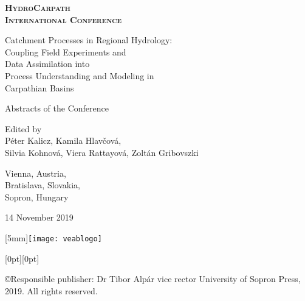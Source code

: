 \begin{titlepage}
\centering
\scshape
\large
\bfseries
HydroCarpath \\
International Conference

\vspace{0.5cm}
Catchment Processes in Regional Hydrology:\\
Coupling Field Experiments and\\
Data Assimilation into\\
Process Understanding and Modeling in\\
Carpathian Basins
\upshape
\normalsize
\mdseries

\vspace{1cm}
Abstracts of the Conference

\vspace{3cm}
Edited by\\
Péter Kalicz, Kamila Hlavčová,\\
Silvia Kohnová, Viera Rattayová, Zoltán Gribovszki


\vfill
Vienna, Austria, \\
Bratislava, Slovakia, \\
Sopron, Hungary

14 November 2019
\end{titlepage}

\newpage{}
\thispagestyle{empty}
\hspace*{\fill} \hspace{4mm} \raisebox{-11mm}[5mm]{\texttt{[image: veablogo]}}


\vspace*{\fill}

\hspace*{\fill} \hspace{1mm} \raisebox{0mm}[0pt][0pt]{}

\noindent{}\copyright{\footnotesize{}Responsible publisher:\newline{} Dr Tibor Alpár vice rector\newline{} University of Sopron Press, 2019. All rights reserved.}




\setcounter{page}{2}

\fancyhead[LE,RO]{\thepage}


\tableofcontents{}
\newpage{}

\setcounter{articleid}{0}


\printindex


